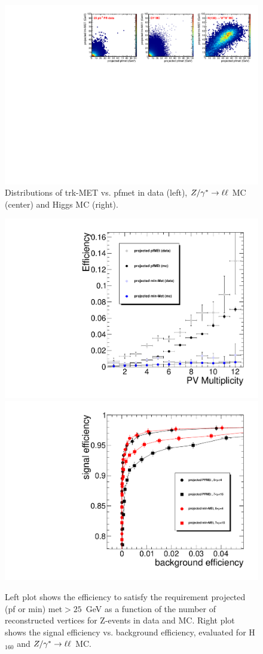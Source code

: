 \begin{figure}[hbt]
\begin{center}
\includegraphics[width=1\linewidth]{figures/met_scatter.pdf} 
\caption{\label{fig:met_scatter}\protect Distributions of trk-MET vs. pfmet in data (left), $Z/\gamma^*\to\ell\ell$ MC (center) and Higgs MC (right).}
\end{center}
\end{figure}

\begin{figure}[hbt]
\begin{center}
\includegraphics[width=0.45\linewidth]{figures/proj_pfmet_minmet_Eff25.pdf} 
\includegraphics[width=0.45\linewidth]{figures/pMetSignalVsBkgrEfficiency.pdf} 
\caption{\label{fig:met_eff}\protect Left plot shows the efficiency to satisfy
 the requirement projected (pf or min) met$>25$~GeV as a function of the number of reconstructed 
vertices for Z-events in data and MC. Right plot shows the signal efficiency 
vs. background efficiency, evaluated for H$_{160}$ and $Z/\gamma^*\to\ell\ell$ MC.}
\end{center}
\end{figure}



